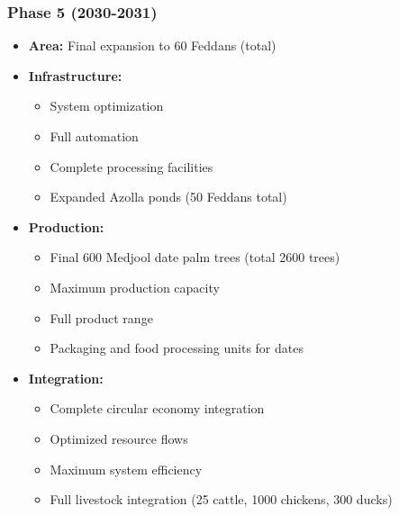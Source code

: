 \subsubsection{Phase 5 (2030-2031)}
\begin{itemize}
    \item \textbf{Area:} Final expansion to 60 Feddans (total)
    \item \textbf{Infrastructure:}
    \begin{itemize}
        \item System optimization
        \item Full automation
        \item Complete processing facilities
        \item Expanded Azolla ponds (50 Feddans total)
    \end{itemize}
    \item \textbf{Production:}
    \begin{itemize}
        \item Final 600 Medjool date palm trees (total 2600 trees)
        \item Maximum production capacity
        \item Full product range
        \item Packaging and food processing units for dates
    \end{itemize}
    \item \textbf{Integration:}
    \begin{itemize}
        \item Complete circular economy integration
        \item Optimized resource flows
        \item Maximum system efficiency
        \item Full livestock integration (25 cattle, 1000 chickens, 300 ducks)
    \end{itemize}
\end{itemize}

